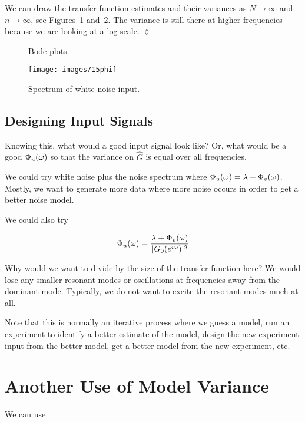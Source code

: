 \begin{example}
We can draw the transfer function estimates and their variances as $N\to\infty$ and $n\to\infty$, see Figures~\ref{fig:15tf} and~\ref{fig:15phi}.
The variance is still there at higher frequencies because we are looking at a log scale.
$\lozenge$
\end{example}

\begin{figure}[ht!]
\centering
{} \hfill
{}
\caption{Bode plots.}%
\label{fig:15tf}
\end{figure}

\begin{figure}[ht!]
\centering
\texttt{[image: images/15phi]}
\caption{Spectrum of white-noise input.}%
\label{fig:15phi}
\end{figure}

\subsection{Designing Input Signals}
Knowing this, what would a good input signal look like? Or, what would be a good $\Phi_u(\omega)$ so that the variance on $\hat{G}$ is equal over all frequencies.

We could try white noise plus the noise spectrum where $\Phi_u(\omega)=\lambda+\Phi_v(\omega)$.
Mostly, we want to generate more data where more noise occurs in order to get a better noise model.

We could also try

\begin{equation*}
\Phi_u(\omega) = \frac{\lambda+\Phi_v(\omega)}{|G_0(e^{i\omega})|^2}
\end{equation*}

Why would we want to divide by the size of the transfer function here? We would lose any smaller resonant modes or oscillations at frequencies away from the dominant mode.
Typically, we do not want to excite the resonant modes much at all.

Note that this is normally an iterative process where we guess a model, run an experiment to identify a better estimate of the model, design the new experiment input from the better model, get a better model from the new experiment, etc.

\section{Another Use of Model Variance}
We can use

